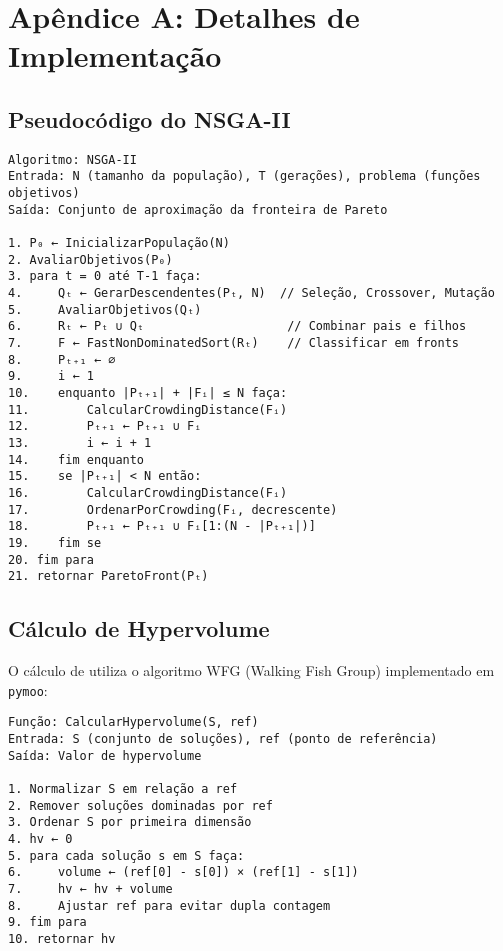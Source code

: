 
\appendix

\section{Apêndice A: Detalhes de Implementação}

\subsection{Pseudocódigo do NSGA-II}

\begin{verbatim}
Algoritmo: NSGA-II
Entrada: N (tamanho da população), T (gerações), problema (funções objetivos)
Saída: Conjunto de aproximação da fronteira de Pareto

1. P₀ ← InicializarPopulação(N)
2. AvaliarObjetivos(P₀)
3. para t = 0 até T-1 faça:
4.     Qₜ ← GerarDescendentes(Pₜ, N)  // Seleção, Crossover, Mutação
5.     AvaliarObjetivos(Qₜ)
6.     Rₜ ← Pₜ ∪ Qₜ                    // Combinar pais e filhos
7.     F ← FastNonDominatedSort(Rₜ)    // Classificar em fronts
8.     Pₜ₊₁ ← ∅
9.     i ← 1
10.    enquanto |Pₜ₊₁| + |Fᵢ| ≤ N faça:
11.        CalcularCrowdingDistance(Fᵢ)
12.        Pₜ₊₁ ← Pₜ₊₁ ∪ Fᵢ
13.        i ← i + 1
14.    fim enquanto
15.    se |Pₜ₊₁| < N então:
16.        CalcularCrowdingDistance(Fᵢ)
17.        OrdenarPorCrowding(Fᵢ, decrescente)
18.        Pₜ₊₁ ← Pₜ₊₁ ∪ Fᵢ[1:(N - |Pₜ₊₁|)]
19.    fim se
20. fim para
21. retornar ParetoFront(Pₜ)
\end{verbatim}

\subsection{Cálculo de Hypervolume}

O cálculo de \hlv{} utiliza o algoritmo WFG (Walking Fish Group) implementado em \texttt{pymoo}:

\begin{verbatim}
Função: CalcularHypervolume(S, ref)
Entrada: S (conjunto de soluções), ref (ponto de referência)
Saída: Valor de hypervolume

1. Normalizar S em relação a ref
2. Remover soluções dominadas por ref
3. Ordenar S por primeira dimensão
4. hv ← 0
5. para cada solução s em S faça:
6.     volume ← (ref[0] - s[0]) × (ref[1] - s[1])
7.     hv ← hv + volume
8.     Ajustar ref para evitar dupla contagem
9. fim para
10. retornar hv
\end{verbatim}

